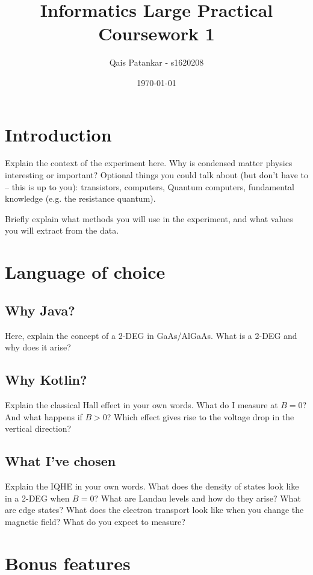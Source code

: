 \documentclass[a4paper]{article}
\title{Informatics Large Practical \\ \large{Coursework 1}}
\author{Qais Patankar - s1620208}
\date{\today}
\begin{document}
      \maketitle
      
      \section{Introduction}
      \label{sec:introduction}
      
      Explain the context of the experiment here. Why is condensed matter physics interesting or important?
      Optional things you could talk about (but don't have to -- this is up to you): transistors, computers, Quantum computers, fundamental knowledge (e.g. the resistance quantum).
      
      Briefly explain what methods you will use in the experiment, and what values you will extract from the data.
      
      \section{Language of choice}
      \label{sec:language}
      
      \subsection{Why Java?}
      Here, explain the concept of a 2-DEG in GaAs/AlGaAs. What is a 2-DEG and why does it arise?
      
      \subsection{Why Kotlin?}
      Explain the classical Hall effect in your own words. What do I measure at $B=0$? And what happens if $B>0$? Which effect gives rise to the voltage drop in the vertical direction?
      
      \subsection{What I've chosen}
      Explain the IQHE in your own words. What does the density of states look like in a 2-DEG when $B=0$? What are Landau levels and how do they arise? What are edge states? What does the electron transport look like when you change the magnetic field? What do you expect to measure?
      
      \section{Bonus features}
      \label{sec:bonus}
\end{document}
